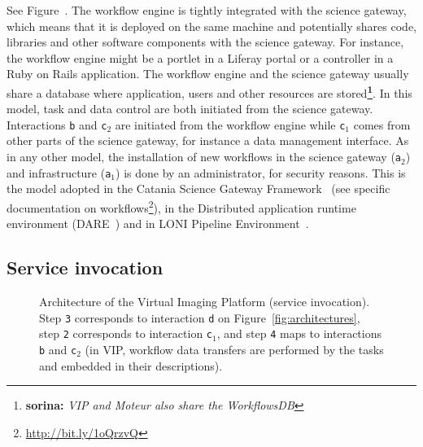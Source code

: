 \documentclass[preprint,3p,twocolumn]{elsarticle}
\newcommand{\note}[2]{\textbf{\Large{\color{blue}\footnote{{\color{blue}\textbf{#1:} \textit{#2}\color{black}}}}}}
\begin{document}
See Figure~. The workflow engine is tightly
integrated with the science gateway, which means that it is deployed
on the same machine and potentially shares code, libraries and other
software components with the science gateway. For instance, the
workflow engine might be a portlet in a Liferay portal or a controller
in a Ruby on Rails application. The workflow engine and the science
gateway usually share a database where application, users and other
resources are stored\note{sorina}{VIP and Moteur also share the WorkflowsDB}. 
In this model, task and data control are both
initiated from the science gateway. Interactions \texttt{b} and
\texttt{c$_2$} are initiated from the workflow engine while
\texttt{c$_1$} comes from other parts of the science gateway, for
instance a data management interface. As in any other model, the
installation of new workflows in the science gateway (\texttt{a$_2$})
and infrastructure (\texttt{a$_1$}) is done by an administrator, for
security reasons. This is the model adopted in the Catania Science
Gateway Framework~\cite{Ardizzone2012} (see specific documentation on
workflows\footnote{\url{http://bit.ly/1oQrzvQ}}), in the Distributed
application runtime environment (DARE~\cite{maddineni2012distributed})
and in LONI Pipeline Environment~\cite{dinov2009efficient}.

\subsection{Service invocation}

\begin{figure}
\centering
\def\svgwidth{1.5\columnwidth}

\caption{Architecture of the Virtual Imaging Platform (service
  invocation).  Step \texttt{3} corresponds to interaction \texttt{d}
  on Figure~\ref{fig:architectures}, step \texttt{2} corresponds to
  interaction \texttt{c$_1$}, and step \texttt{4} maps to interactions
  \texttt{b} and \texttt{c$_2$} (in VIP, workflow data transfers are
  performed by the tasks and embedded in their descriptions).}
\label{fig:vip-architecture}
\end{figure}
\end{document}
